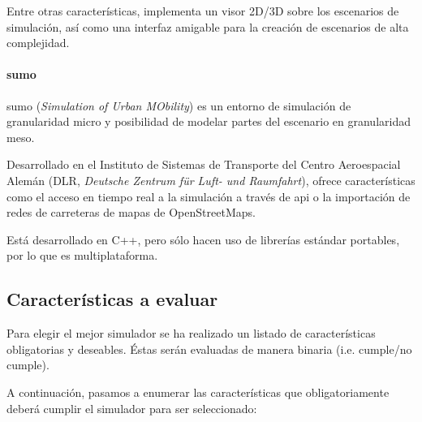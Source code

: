 Entre otras características, implementa un visor 2D/3D sobre los escenarios de simulación, así como una interfaz amigable para la creación de escenarios de alta complejidad.

\paragraph{\gls{sumo}}

\gls{sumo} (\textit{Simulation of Urban MObility}) es un entorno de simulación de granularidad micro y posibilidad de modelar partes del escenario en granularidad meso.

Desarrollado en el Instituto de Sistemas de Transporte del Centro Aeroespacial Alemán (DLR, \textit{Deutsche Zentrum für Luft- und Raumfahrt}), ofrece características como el acceso en tiempo real a la simulación a través de \acrshort{api} o la importación de redes de carreteras de mapas de OpenStreetMaps.

Está desarrollado en C++, pero sólo hacen uso de librerías estándar portables, por lo que es multiplataforma.

\subsection{Características a evaluar}

Para elegir el mejor simulador se ha realizado un listado de características obligatorias y deseables. Éstas serán evaluadas de manera binaria (i.e. cumple/no cumple).

A continuación, pasamos a enumerar las características que obligatoriamente deberá cumplir el simulador para ser seleccionado:

